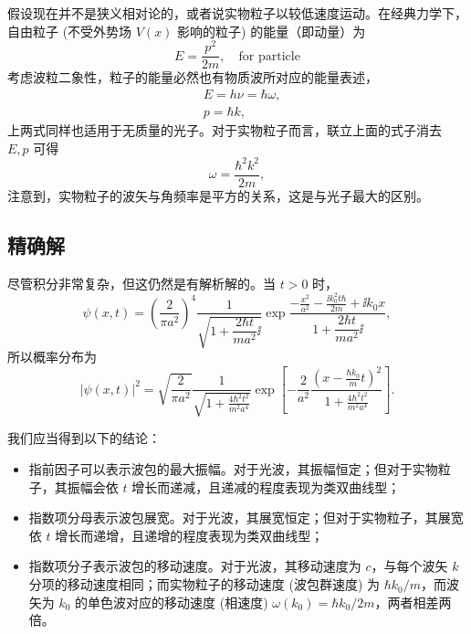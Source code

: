 假设现在并不是狭义相对论的，或者说实物粒子以较低速度运动。在经典力学下，自由粒子 (不受外势场 $V (x)$ 影响的粒子) 的能量（即动量）为
\begin{equation}
    E = \frac{p^2}{2m}, \quad \text{for particle}
\end{equation}
考虑波粒二象性，粒子的能量必然也有物质波所对应的能量表述，
\begin{align}
    &E = h\nu = \hbar \omega, \\
    &p = \hbar k, 
\end{align}
上两式同样也适用于无质量的光子。对于实物粒子而言，联立上面的式子消去 $E,p$ 可得
\begin{equation}
    \omega = \frac{\hbar^2k^2}{2m},
\end{equation}
注意到，实物粒子的波矢与角频率是平方的关系，这是与光子最大的区别。


\subsection{精确解}
尽管积分非常复杂，但这仍然是有解析解的。当 $t > 0$ 时，
\begin{equation}
    \psi(x,t) = \left(\frac{2}{\pi a^2}\right)^4 \frac1 {\sqrt{ 1 + \dfrac{2\hbar t}{ma^2}\ii}} \exp \frac {\displaystyle -\frac{x^2}{a^2}-\frac{\ii k_0^2 t \hbar }{2 m}+\ii
    k_0 x} {1 + \dfrac{2\hbar t}{ma^2}\ii},
\end{equation}
所以概率分布为
\begin{equation}
    |\psi(x, t)|^2 = \sqrt{\frac{2}{\pi a^2}} \frac{1}{\sqrt{1 + \displaystyle \frac{4 \hbar^2 t^2}{m^2 a^4}}} \exp \left[ - \frac{2}{a^2} \frac{\left( x - \displaystyle \frac{\hbar k_0}{m} t \right)^2}{1 + \displaystyle \frac{4 \hbar^2 t^2}{m^2 a^4}} \right]. 
\end{equation}

我们应当得到以下的结论：
\begin{itemize}[nosep]
  \item 指前因子可以表示波包的最大振幅。对于光波，其振幅恒定；但对于实物粒子，其振幅会依 $t$ 增长而递减，且递减的程度表现为类双曲线型；
  \item 指数项分母表示波包展宽。对于光波，其展宽恒定；但对于实物粒子，其展宽依 $t$ 增长而递增，且递增的程度表现为类双曲线型；
  \item 指数项分子表示波包的移动速度。对于光波，其移动速度为 $c$，与每个波矢 $k$ 分项的移动速度相同；而实物粒子的移动速度 (波包群速度) 为 $\hbar k_0 / m$，而波矢为 $k_0$ 的单色波对应的移动速度 (相速度) $\omega(k_0) = \hbar k_0 / 2m$，两者相差两倍。
\end{itemize}

